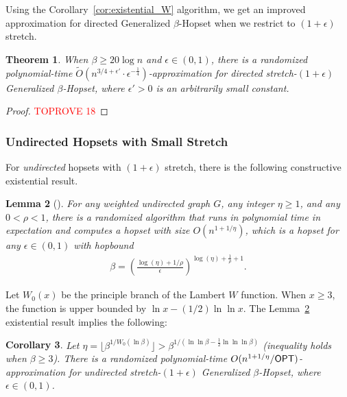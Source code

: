 \documentclass{article}
\newtheorem{theorem}{Theorem}[section]
\newtheorem{corollary}[theorem]{Corollary}
\newtheorem{lemma}[theorem]{Lemma}
\theoremstyle{definition}
\theoremstyle{remark}
\def\be    {\beta}
\def\opt {{\sf OPT}}
\def\hopset {{\sc Generalized $\beta$-Hopset}}
\begin{document}
Using the Corollary~\ref{cor:existential_W} algorithm, we get an improved approximation for directed {\hopset} when we restrict to $(1+\epsilon)$ stretch. 

\begin{theorem} \label{thm:dir_eps}
    When $\beta \geq 20\log n$ and $\epsilon \in (0,1)$, there is a randomized polynomial-time $\widetilde{O}(n^{3/4 + \epsilon'} \cdot \epsilon^{-\frac{1}{4}})$-approximation for directed stretch-$(1+\epsilon)$ {\hopset}, where $\epsilon' > 0$ is an arbitrarily small constant.
\end{theorem}
\begin{proof}\textcolor{red}{TOPROVE 18}\end{proof}


\subsubsection{Undirected Hopsets with Small Stretch}
For \textit{undirected} hopsets with $(1+\epsilon)$ stretch, there is the following constructive existential result.

\begin{lemma}[\hspace{1sp}\cite{elkin2019RNC}] \label{lem:existential_undir_eps}
    For any weighted undirected graph $G$, any integer $\eta \geq 1$, and any $0 < \rho < 1$, there is a randomized algorithm that runs in polynomial time in expectation and computes a hopset with size $O(n^{1 + 1/\eta})$, which is a hopset for any $\epsilon \in (0,1)$ with hopbound
    \begin{align*}
        \beta = \left( \frac{\log(\eta) + 1/\rho }{\epsilon}   \right)^{\log(\eta) + \frac{1}{\rho}+1} .
    \end{align*}
\end{lemma}

Let $W_0(x)$ be the principle branch of the Lambert $W$ function. When $x \geq 3$, the function is upper bounded by $\ln{x} - (1/2) \ln{\ln{x}}$. The Lemma~\ref{lem:existential_undir_eps} existential result implies the following:

\begin{corollary} \label{cor:existential_undir_eps}
    Let $\eta = \lfloor \beta^{1/W_0(\ln{\beta})} \rfloor > \be^{1/(\ln{\ln{\be}}-\frac{1}{2}\ln{\ln{\ln{\be}}})}$ (inequality holds when $\be \geq 3$). There is a randomized polynomial-time $O(n^{1 + 1/\eta} / {\opt})$-approximation for undirected stretch-$(1+\epsilon)$ {\hopset}, where $\epsilon \in (0,1)$.
\end{corollary}
\end{document}
